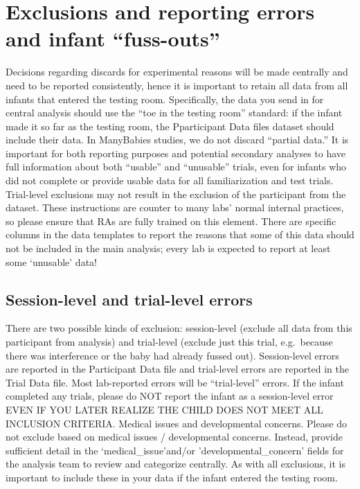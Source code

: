 \documentclass[
  letterpaper,
  DIV=11,
  numbers=noendperiod,
  oneside]{scrreprt}
\begin{document}
\section{Exclusions and reporting errors and infant
``fuss-outs''}\label{exclusions-and-reporting-errors-and-infant-fuss-outs}

Decisions regarding discards for experimental reasons will be made
centrally and need to be reported consistently, hence it is important to
retain all data from all infants that entered the testing room.
Specifically, the data you send in for central analysis should use the
``toe in the testing room'' standard: if the infant made it so far as
the testing room, the Pparticipant Data files dataset should include
their data. In ManyBabies studies, we do not discard ``partial data.''
It is important for both reporting purposes and potential secondary
analyses to have full information about both ``usable'' and ``unusable''
trials, even for infants who did not complete or provide usable data for
all familiarization and test trials. Trial-level exclusions may not
result in the exclusion of the participant from the dataset. These
instructions are counter to many labs' normal internal practices, so
please ensure that RAs are fully trained on this element. There are
specific columns in the data templates to report the reasons that some
of this data should not be included in the main analysis; every lab is
expected to report at least some `unusable' data!

\subsection{Session-level and trial-level
errors}\label{session-level-and-trial-level-errors}

There are two possible kinds of exclusion: session-level (exclude all
data from this participant from analysis) and trial-level (exclude just
this trial, e.g.~because there was interference or the baby had already
fussed out). Session-level errors are reported in the Participant Data
file and trial-level errors are reported in the Trial Data file. Most
lab-reported errors will be ``trial-level'' errors. If the infant
completed any trials, please do NOT report the infant as a session-level
error EVEN IF YOU LATER REALIZE THE CHILD DOES NOT MEET ALL INCLUSION
CRITERIA. Medical issues and developmental concerns. Please do not
exclude based on medical issues / developmental concerns. Instead,
provide sufficient detail in the `medical\_issue'and/or
'developmental\_concern' fields for the analysis team to review and
categorize centrally. As with all exclusions, it is important to include
these in your data if the infant entered the testing room.
\end{document}
